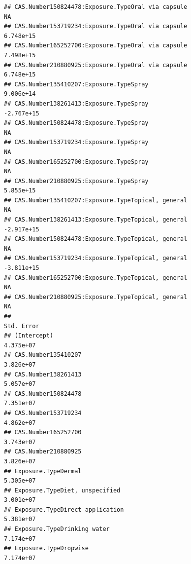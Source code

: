 \documentclass[
  12pt,
]{article}
\begin{document}
\begin{verbatim}
## CAS.Number150824478:Exposure.TypeOral via capsule                                   NA
## CAS.Number153719234:Exposure.TypeOral via capsule                            6.748e+15
## CAS.Number165252700:Exposure.TypeOral via capsule                            7.498e+15
## CAS.Number210880925:Exposure.TypeOral via capsule                            6.748e+15
## CAS.Number135410207:Exposure.TypeSpray                                       9.006e+14
## CAS.Number138261413:Exposure.TypeSpray                                      -2.767e+15
## CAS.Number150824478:Exposure.TypeSpray                                              NA
## CAS.Number153719234:Exposure.TypeSpray                                              NA
## CAS.Number165252700:Exposure.TypeSpray                                              NA
## CAS.Number210880925:Exposure.TypeSpray                                       5.855e+15
## CAS.Number135410207:Exposure.TypeTopical, general                                   NA
## CAS.Number138261413:Exposure.TypeTopical, general                           -2.917e+15
## CAS.Number150824478:Exposure.TypeTopical, general                                   NA
## CAS.Number153719234:Exposure.TypeTopical, general                           -3.811e+15
## CAS.Number165252700:Exposure.TypeTopical, general                                   NA
## CAS.Number210880925:Exposure.TypeTopical, general                                   NA
##                                                                             Std. Error
## (Intercept)                                                                  4.375e+07
## CAS.Number135410207                                                          3.826e+07
## CAS.Number138261413                                                          5.057e+07
## CAS.Number150824478                                                          7.351e+07
## CAS.Number153719234                                                          4.862e+07
## CAS.Number165252700                                                          3.743e+07
## CAS.Number210880925                                                          3.826e+07
## Exposure.TypeDermal                                                          5.305e+07
## Exposure.TypeDiet, unspecified                                               3.001e+07
## Exposure.TypeDirect application                                              5.381e+07
## Exposure.TypeDrinking water                                                  7.174e+07
## Exposure.TypeDropwise                                                        7.174e+07

\end{verbatim}
\end{document}

